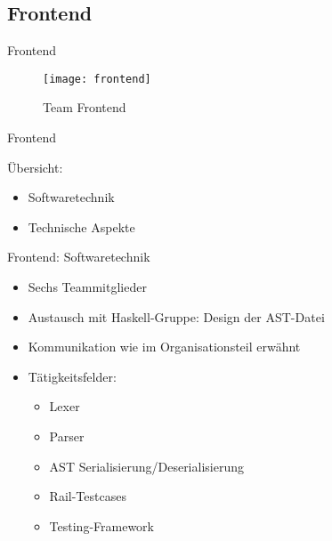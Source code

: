 \subsection{Frontend}

\begin{frame}{Frontend}

	\begin{figure}
	  \begin{center}
	    \leavevmode
	      \texttt{[image: frontend]}
	    \caption{Team Frontend}
	  \end{center}
	\end{figure}

\end{frame}

\begin{frame}{Frontend}

	\pause
	\"Ubersicht:
	\pause
	\begin{itemize}
		\item Softwaretechnik
		\pause
		\item Technische Aspekte
	\end{itemize}

\end{frame}

\pagepreak


\begin{frame}{Frontend: Softwaretechnik}
	
	\pause
	\begin{itemize}
		\item Sechs Teammitglieder
		\pause
		\item Austausch mit Haskell-Gruppe: Design der AST-Datei
		\pause
		\item Kommunikation wie im Organisationsteil erw\"ahnt
		\pause
		\item T\"atigkeitsfelder:
		\pause
		\begin{itemize}
			\item Lexer
			\pause
			\item Parser
			\pause
			\item AST Serialisierung/Deserialisierung
			\pause
			\item Rail-Testcases
			\pause
			\item Testing-Framework
		\end{itemize}
	\end{itemize}
	
\end{frame}

